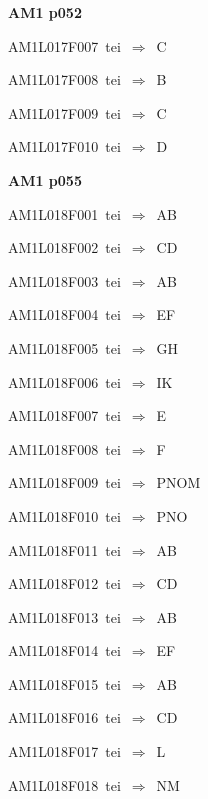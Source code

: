 \par\vfill\eject
{\bf\hfill AM1 p052\hfill\hbox{}}\par\bigskip
{\sixrm AM1L017F007\ {\sixit tei}\ }$\Rightarrow$\ C\par\smallskip
{\sixrm AM1L017F008\ {\sixit tei}\ }$\Rightarrow$\ B\par\smallskip
{\sixrm AM1L017F009\ {\sixit tei}\ }$\Rightarrow$\ C\par\smallskip
{\sixrm AM1L017F010\ {\sixit tei}\ }$\Rightarrow$\ D\par\smallskip

\par\vfill\eject
{\bf\hfill AM1 p055\hfill\hbox{}}\par\bigskip
{\sixrm AM1L018F001\ {\sixit tei}\ }$\Rightarrow$\ AB\par\smallskip
{\sixrm AM1L018F002\ {\sixit tei}\ }$\Rightarrow$\ CD\par\smallskip
{\sixrm AM1L018F003\ {\sixit tei}\ }$\Rightarrow$\ AB\par\smallskip
{\sixrm AM1L018F004\ {\sixit tei}\ }$\Rightarrow$\ EF\par\smallskip
{\sixrm AM1L018F005\ {\sixit tei}\ }$\Rightarrow$\ GH\par\smallskip
{\sixrm AM1L018F006\ {\sixit tei}\ }$\Rightarrow$\ IK\par\smallskip
{\sixrm AM1L018F007\ {\sixit tei}\ }$\Rightarrow$\ E\par\smallskip
{\sixrm AM1L018F008\ {\sixit tei}\ }$\Rightarrow$\ F\par\smallskip
{\sixrm AM1L018F009\ {\sixit tei}\ }$\Rightarrow$\ PNOM\par\smallskip
{\sixrm AM1L018F010\ {\sixit tei}\ }$\Rightarrow$\ PNO\par\smallskip
{\sixrm AM1L018F011\ {\sixit tei}\ }$\Rightarrow$\ AB\par\smallskip
{\sixrm AM1L018F012\ {\sixit tei}\ }$\Rightarrow$\ CD\par\smallskip
{\sixrm AM1L018F013\ {\sixit tei}\ }$\Rightarrow$\ AB\par\smallskip
{\sixrm AM1L018F014\ {\sixit tei}\ }$\Rightarrow$\ EF\par\smallskip
{\sixrm AM1L018F015\ {\sixit tei}\ }$\Rightarrow$\ AB\par\smallskip
{\sixrm AM1L018F016\ {\sixit tei}\ }$\Rightarrow$\ CD\par\smallskip
{\sixrm AM1L018F017\ {\sixit tei}\ }$\Rightarrow$\ L\par\smallskip
{\sixrm AM1L018F018\ {\sixit tei}\ }$\Rightarrow$\ NM\par\smallskip
